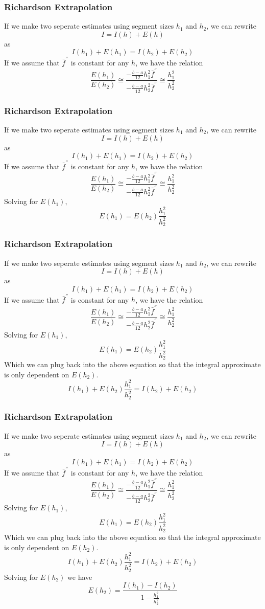 \documentclass{if-beamer}
\begin{document}
\begin{frame}[t]
	\frametitle{Richardson Extrapolation}
	If we make two seperate estimates using segment sizes $h_1$ and $h_2$, we can rewrite
	$$I = I(h) +E(h)$$
	as 
	$$I(h_1) +E(h_1) = I(h_2) +E(h_2)$$
	If we assume that $\bar{f}^{''}$ is constant for any $h$, we have the relation
	$$\frac{E(h_1)}{E(h_2)} \cong \frac{-\frac{b-a}{12}h_1^2\bar{f}^{''}}{-\frac{b-a}{12}h_2^2\bar{f}^{''}} \cong \frac{h_1^2}{h_2^2}$$	
\end{frame}

\begin{frame}[t]
	\frametitle{Richardson Extrapolation}
	If we make two seperate estimates using segment sizes $h_1$ and $h_2$, we can rewrite
	$$I = I(h) +E(h)$$
	as 
	$$I(h_1) +E(h_1) = I(h_2) +E(h_2)$$
	If we assume that $\bar{f}^{''}$ is constant for any $h$, we have the relation
	$$\frac{E(h_1)}{E(h_2)} \cong \frac{-\frac{b-a}{12}h_1^2\bar{f}^{''}}{-\frac{b-a}{12}h_2^2\bar{f}^{''}} \cong \frac{h_1^2}{h_2^2}$$
	Solving for $E(h_1)$,
	$$ E(h_1) = E(h_2)\frac{h_1^2}{h_2^2}$$	
\end{frame}
\begin{frame}[t]
	\frametitle{Richardson Extrapolation}
	If we make two seperate estimates using segment sizes $h_1$ and $h_2$, we can rewrite
	$$I = I(h) +E(h)$$
	as 
	$$I(h_1) +E(h_1) = I(h_2) +E(h_2)$$
	If we assume that $\bar{f}^{''}$ is constant for any $h$, we have the relation
	$$\frac{E(h_1)}{E(h_2)} \cong \frac{-\frac{b-a}{12}h_1^2\bar{f}^{''}}{-\frac{b-a}{12}h_2^2\bar{f}^{''}} \cong \frac{h_1^2}{h_2^2}$$
	Solving for $E(h_1)$,
	$$ E(h_1) = E(h_2)\frac{h_1^2}{h_2^2}$$
	Which we can plug back into the above equation so that the integral approximate is only dependent on $E(h_2)$.
	$$I(h_1) +E(h_2)\frac{h_1^2}{h_2^2} = I(h_2) +E(h_2)$$	
\end{frame}

\begin{frame}[t]
	\frametitle{Richardson Extrapolation}
	If we make two seperate estimates using segment sizes $h_1$ and $h_2$, we can rewrite
	$$I = I(h) +E(h)$$
	as 
	$$I(h_1) +E(h_1) = I(h_2) +E(h_2)$$
	If we assume that $\bar{f}^{''}$ is constant for any $h$, we have the relation
	$$\frac{E(h_1)}{E(h_2)} \cong \frac{-\frac{b-a}{12}h_1^2\bar{f}^{''}}{-\frac{b-a}{12}h_2^2\bar{f}^{''}} \cong \frac{h_1^2}{h_2^2}$$
	Solving for $E(h_1)$,
	$$ E(h_1) = E(h_2)\frac{h_1^2}{h_2^2}$$
	Which we can plug back into the above equation so that the integral approximate is only dependent on $E(h_2)$.
	$$I(h_1) +E(h_2)\frac{h_1^2}{h_2^2} = I(h_2) +E(h_2)$$
	Solving for $E(h_2)$ we have
	$$E(h_2) = \frac{I(h_1)-I(h_2)}{1-\frac{h_1^2}{h_2^2}}$$	
\end{frame}
\end{document}
